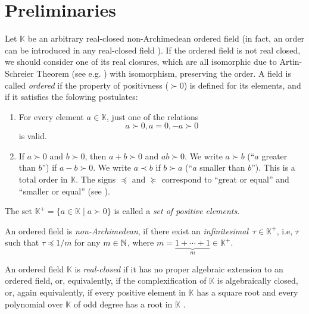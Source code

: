 \documentclass[a4paper,12pt]{amsart}
\theoremstyle{definition}
\newcommand{\K}{\mathbb{K}}
\begin{document}
\section{Preliminaries}
\label{Section::preliminaries}
Let $\K$ be an arbitrary real-closed non-Archimedean ordered field (in fact, an order can be introduced in any real-closed field \cite[Theorem 2.2]{Lang}).  If the ordered field is not real closed, we should consider one of its real closures, which are all isomorphic due to Artin-Schreier Theorem (see e.g. \cite{DalesHughWoodin}) with isomorphism, preserving the order. A field is called \emph{ordered} if the property of positivness ($\succ 0$) is defined for its elements, and if it satisfies the folowing postulates:
\begin{enumerate}
\item
For every element $a\in \K$, just one of the relations 
$$
a\succ 0, a=0, -a\succ 0
$$
is valid.
\item
If $a\succ 0$ and $b\succ 0$, then $a+b\succ 0$ and $ab\succ 0$. We write $a\succ b$ (``$a$ greater than $b$'') if $a-b\succ 0$. We write $a\prec b$ if $b\succ a$ (``$a$ smaller than $b$''). This is a total order in $\K$. The signs $\preceq$ and $\succeq$ correspond to ``great or equal'' and ``smaller or equal'' 
(see \cite{Waerden}).
\end{enumerate}
The set $\K^+=\{a \in \K\mid a\succ 0\}$ is called a \emph{set of positive elements}.

An ordered field is  \emph{non-Archimedean}, if there exist an \emph{infinitesimal}~$\tau\in \K^+$, i.e, $\tau$ such that $\tau\preceq 1/m$ for any $m\in \Bbb N$, where $m=\underbrace{1+\cdots+1}_{m}\in \K^+$.


An ordered field $\K$ is \emph{real-closed} if it has no proper algebraic extension to an ordered field, or, equivalently, if the complexification of $\K$ is algebraically closed, or, again equivalently, if every positive element in $\K$ has a square root and every polynomial over $\K$ of odd degree has a root in $\K$ \cite[p. 38]{DalesHughWoodin}. 
\end{document}
